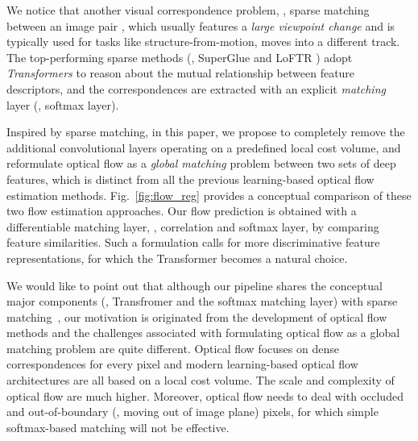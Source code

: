 \documentclass[10pt,twocolumn,letterpaper]{article}
\begin{document}
We notice that %
another visual correspondence problem, \ie, sparse matching between an image pair \cite{sarlin2020superglue,wang2020learning,sun2021loftr}, which usually features a \emph{large viewpoint change} and is typically used for tasks like structure-from-motion, moves into a different track. %
The top-performing sparse methods (\eg, SuperGlue \cite{sarlin2020superglue} and LoFTR \cite{sun2021loftr}) adopt \emph{Transformers} \cite{vaswani2017attention} to reason about the mutual relationship between feature descriptors, and the correspondences are extracted with an explicit \emph{matching} layer (\eg, softmax layer). 





Inspired by sparse matching, in this paper, we propose to completely remove the additional convolutional layers operating on a predefined local cost volume, and reformulate optical flow as a \emph{global matching} problem between two sets of deep features, which is distinct from all the previous learning-based optical flow estimation methods. Fig.~\ref{fig:flow_reg} provides a conceptual comparison of these two flow estimation approaches. Our flow prediction is obtained with a differentiable matching layer, \ie, correlation and softmax layer, by comparing feature similarities. Such a formulation calls for more discriminative feature representations, for which the Transformer \cite{vaswani2017attention} becomes a natural choice.%


We would like to point out that although our pipeline shares the conceptual major components (\ie, Transfromer and the softmax matching layer) with sparse matching~\cite{sarlin2020superglue,sun2021loftr}, our motivation is originated from the development of optical flow methods and the challenges associated with formulating optical flow as a global matching problem are quite different. Optical flow focuses on dense correspondences for every pixel and modern learning-based optical flow architectures are all based on a local cost volume. The scale and complexity of optical flow are much higher. Moreover, optical flow needs to deal with occluded and out-of-boundary (\ie, moving out of image plane) pixels, for which simple softmax-based matching will not be effective.   
\end{document}
